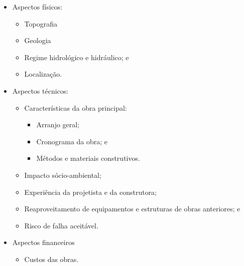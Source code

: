 \begin{itemize}
	\item Aspectos físicos:
	\begin{itemize}
		\item Topografia
		\item Geologia
		\item Regime hidrológico e hidráulico; e
		\item Localização.
	\end{itemize}
	\item Aspectos técnicos:
	\begin{itemize}
		\item Características da obra principal:
		\begin{itemize}
			\item Arranjo geral;
			\item Cronograma da obra; e
			\item Métodos e materiais construtivos.
		\end{itemize}
		\item Impacto sócio-ambiental;
		\item Experiência da projetista e da construtora;
		\item Reaproveitamento de equipamentos e estruturas de obras anteriores; e
		\item Risco de falha aceitável.
	\end{itemize}
	\item Aspectos financeiros
	\begin{itemize}
		\item Custos das obras.
	\end{itemize}
\end{itemize}